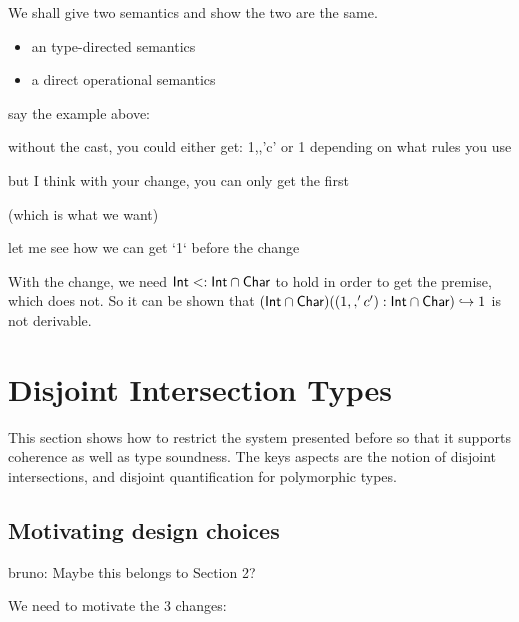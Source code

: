 \documentclass[nocopyrightspace,preprint,times,9pt]{sigplanconf}
\newcommand{\authornote}[3]{{\color{#2} {\sc #1}: #3}}
\newcommand\bruno[1]{\authornote{bruno}{red}{#1}}
\begin{document}
We shall give two semantics and show the two are the same.

\begin{itemize}
\item an type-directed semantics
\item a direct operational semantics
\end{itemize}

say the example above:

without the cast, you could either get:
1,,'c'
or
1
depending on what rules you use

but I think with your change, you can only get the first

(which is what we want)

let me see how we can get `1` before the change

\begin{mathpar}

\end{mathpar}


With the change, we need $\code{Int} \subtype \code{Int} \intersect \code{Char}$ to
hold in order to get the premise, which does not. So it can be shown that
$(\code{Int} \intersect \code{Char}) ((1 \mergeOp 'c') : \code{Int} \intersect
\code{Char}) \hookrightarrow 1$ is not derivable.








\section{Disjoint Intersection Types}

This section shows how to restrict the system presented before
so that it supports coherence as well as type soundness.
The keys aspects are the notion of disjoint intersections,
and disjoint quantification for polymorphic types.

\subsection{Motivating design choices}\bruno{Maybe this belongs to Section 2?}

We need to motivate the 3 changes:
\end{document}
